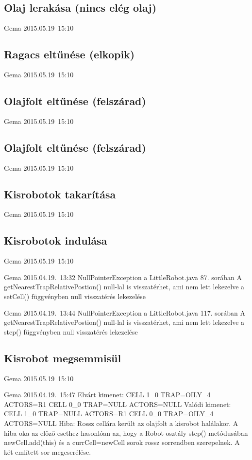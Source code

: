 \subsection{Olaj lerakása (nincs elég olaj)}
\tesztok
{Gema}
{2015.05.19~15:10}

\subsection{Ragacs eltűnése (elkopik)}
\tesztok
{Gema}
{2015.05.19~15:10}

\subsection{Olajfolt eltűnése (felszárad)}
\tesztok
{Gema}
{2015.05.19~15:10}

\subsection{Olajfolt eltűnése (felszárad)}
\tesztok
{Gema}
{2015.05.19~15:10}

\subsection{Kisrobotok takarítása}
\tesztok
{Gema}
{2015.05.19~15:10}

\subsection{Kisrobotok indulása}
\tesztok
{Gema}
{2015.05.19~15:10}

\tesztfail
{Gema}
{2015.04.19.~13:32}
{NullPointerException a LittleRobot.java 87. sorában}
{A getNearestTrapRelativePostion() null-lal is visszatérhet, ami nem lett lekezelve a setCell() függvényben}
{null visszatérés lekezelése}

\tesztfail
{Gema}
{2015.04.19.~13:44}
{NullPointerException a LittleRobot.java 117. sorában}
{A getNearestTrapRelativePostion() null-lal is visszatérhet, ami nem lett lekezelve a step() függvényben}
{null visszatérés lekezelése}

\subsection{Kisrobot megsemmisül}
\tesztok
{Gema}
{2015.05.19~15:10}

\tesztfail
{Gema}
{2015.04.19.~15:47}
{Elvárt kimenet:\newline
CELL 1\_0 TRAP=OILY\_4 ACTORS=R1\newline
CELL 0\_0 TRAP=NULL ACTORS=NULL\newline
Valódi kimenet:\newline
CELL 1\_0 TRAP=NULL ACTORS=R1\newline
CELL 0\_0 TRAP=OILY\_4 ACTORS=NULL\newline
Hiba: Rossz cellára került az olajfolt a kisrobot halálakor.
}
{A hiba oka az előző esethez hasonlóan az, hogy a Robot osztály step() metódusában newCell.add(this) és a currCell=newCell sorok rossz sorrendben szerepelnek.}
{A két említett sor megcserélése.}

